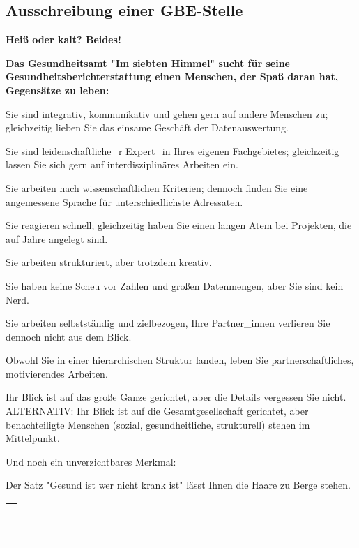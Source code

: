 \documentclass{article}
\begin{document}
\subsection{Ausschreibung einer GBE-Stelle}\label{H6109369}



\textbf{Heiß oder kalt? Beides!}


\textbf{Das Gesundheitsamt "Im siebten Himmel" sucht für seine Gesundheitsberichterstattung einen Menschen, der Spaß daran hat, Gegensätze zu leben:}


Sie sind integrativ, kommunikativ und gehen gern auf andere Menschen zu; gleichzeitig lieben Sie das einsame Geschäft der Datenauswertung.


Sie sind leidenschaftliche\_r Expert\_in Ihres eigenen Fachgebietes; gleichzeitig lassen Sie sich gern auf interdisziplinäres Arbeiten ein.


Sie arbeiten nach wissenschaftlichen Kriterien; dennoch finden Sie eine angemessene Sprache für unterschiedlichste Adressaten.


Sie reagieren schnell; gleichzeitig haben Sie einen langen Atem bei Projekten, die auf Jahre angelegt sind.


Sie arbeiten strukturiert, aber trotzdem kreativ. 


Sie haben keine Scheu vor Zahlen und großen Datenmengen, aber Sie sind kein Nerd.


Sie arbeiten selbstständig und zielbezogen, Ihre Partner\_innen verlieren Sie dennoch nicht aus dem Blick.


Obwohl Sie in einer hierarchischen Struktur landen, leben Sie partnerschaftliches, motivierendes Arbeiten.


Ihr Blick ist auf das große Ganze gerichtet, aber die Details vergessen Sie nicht. ALTERNATIV: Ihr Blick ist auf die Gesamtgesellschaft gerichtet, aber benachteiligte Menschen (sozial, gesundheitliche, strukturell) stehen im Mittelpunkt.


Und noch ein unverzichtbares Merkmal:


Der Satz "Gesund ist wer nicht krank ist" lässt Ihnen die Haare zu Berge stehen.





\begin{tabu} to \textwidth { |X| }
\hline




 \\



 \\



 \\



 \\



 \\



 \\



 \\



 \\



 \\
\hline

\end{tabu}
\end{document}
